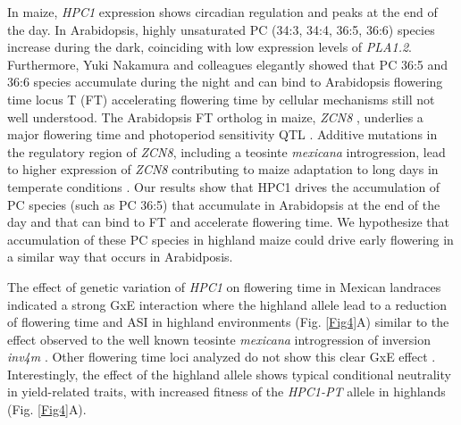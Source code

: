 \documentclass[9pt,twocolumn,twoside,lineno]{BioRxiv}
\begin{document}
In maize, \textit{HPC1} expression shows circadian regulation\cite{Khan2010-iv} and peaks at the end of the day. 
In Arabidopsis, highly unsaturated PC (34:3, 34:4, 36:5, 36:6) species increase during the dark\cite{Maatta2012-ip}, coinciding with low expression levels of \textit{PLA1.2}\cite{Khan2010-iv}.
Furthermore, Yuki Nakamura and colleagues elegantly showed that PC 36:5 and 36:6 species accumulate during the night and can bind to Arabidopsis flowering time locus T (FT) accelerating flowering time \cite{Nakamura2014-qf} by cellular mechanisms still not well understood. 
The Arabidopsis FT ortholog in maize, \textit{ZCN8} \cite{Lazakis2011-nq}, underlies a major flowering time and photoperiod sensitivity QTL \cite{Hung2012-ms}.
Additive mutations in the regulatory region of \textit{ZCN8}, including a teosinte \textit{mexicana} introgression, lead to higher expression of \textit{ZCN8} contributing to maize adaptation to long days in temperate conditions \cite{Guo2019-pn}.
Our results show that HPC1 drives the accumulation of PC species (such as PC 36:5) that accumulate in Arabidopsis at the end of the day and that can bind to FT and accelerate flowering time. 
We hypothesize that accumulation of these PC species in highland maize could drive early flowering in a similar way that occurs in Arabidposis. 

The effect of genetic variation of \textit{HPC1} on flowering time in Mexican landraces indicated a strong GxE interaction where the highland allele lead to a reduction of flowering time and ASI in highland environments (Fig. \ref{Fig4}A) similar to the effect observed to the well known teosinte \textit{mexicana} introgression of inversion \textit{inv4m} \cite{Crow2020-gene}.
Other flowering time loci analyzed do not show this clear GxE effect \cite{Gates2019-xu}.
Interestingly, the effect of the highland allele shows typical conditional neutrality in yield-related traits, with increased fitness of the \textit{HPC1-PT} allele in highlands (Fig. \ref{Fig4}A).
\end{document}
